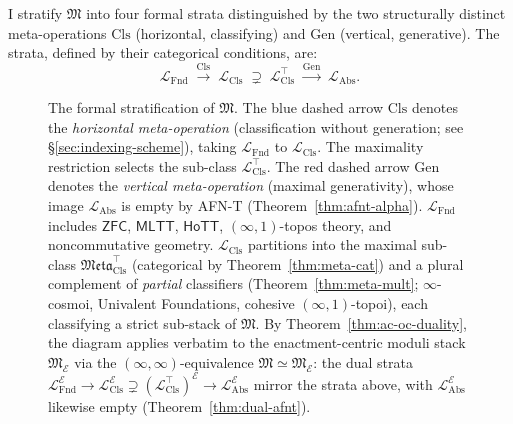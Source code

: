 \documentclass[11pt]{article}
\theoremstyle{plain}
\theoremstyle{definition}
\newcommand{\fM}{\mathfrak{M}}
\newcommand{\Meta}{\mathfrak{Meta}}
\newcommand{\LFnd}{\mathcal{L}_{\mathrm{Fnd}}}
\newcommand{\LCls}{\mathcal{L}_{\mathrm{Cls}}}
\newcommand{\LClsMax}{\mathcal{L}_{\mathrm{Cls}}^{\top}}
\newcommand{\LAbs}{\mathcal{L}_{\mathrm{Abs}}}
\newcommand{\ZFC}{\mathsf{ZFC}}
\newcommand{\MLTT}{\mathsf{MLTT}}
\newcommand{\HoTT}{\mathsf{HoTT}}
\newcommand{\cE}{\mathcal{E}}
\newcommand{\LAbsE}{\LAbs^{\cE}}
\newcommand{\LClsE}{\LCls^{\cE}}
\newcommand{\LClsMaxE}{(\LClsMax)^{\cE}}
\newcommand{\LFndE}{\LFnd^{\cE}}
\begin{document}
I stratify $\fM$ into four formal strata distinguished by the two structurally distinct meta-operations $\mathrm{Cls}$ (horizontal, classifying) and $\mathrm{Gen}$ (vertical, generative). The strata, defined by their categorical conditions, are:
\[
\LFnd \;\xrightarrow{\mathrm{Cls}}\; \LCls \;\supsetneq\; \LClsMax \;\xrightarrow{\mathrm{Gen}}\; \LAbs.
\]

\begin{figure}[ht]
\centering
{}
\caption{The formal stratification of $\fM$. The blue dashed arrow $\mathrm{Cls}$ denotes the \emph{horizontal meta-operation} (classification without generation; see \S\ref{sec:indexing-scheme}), taking $\LFnd$ to $\LCls$. The maximality restriction selects the sub-class $\LClsMax$. The red dashed arrow $\mathrm{Gen}$ denotes the \emph{vertical meta-operation} (maximal generativity), whose image $\LAbs$ is empty by AFN-T (Theorem~\ref{thm:afnt-alpha}). $\LFnd$ includes $\ZFC$, $\MLTT$, $\HoTT$, $(\infty, 1)$-topos theory, and noncommutative geometry. $\LCls$ partitions into the maximal sub-class $\Meta_{\mathrm{Cls}}^{\top}$ (categorical by Theorem~\ref{thm:meta-cat}) and a plural complement of \emph{partial} classifiers (Theorem~\ref{thm:meta-mult}; $\infty$-cosmoi, Univalent Foundations, cohesive $(\infty, 1)$-topoi), each classifying a strict sub-stack of $\fM$. By Theorem~\ref{thm:ac-oc-duality}, the diagram applies verbatim to the enactment-centric moduli stack $\fM_\cE$ via the $(\infty, \infty)$-equivalence $\fM \simeq \fM_\cE$: the dual strata $\LFndE \to \LClsE \supsetneq \LClsMaxE \to \LAbsE$ mirror the strata above, with $\LAbsE$ likewise empty (Theorem~\ref{thm:dual-afnt}).}
\label{fig:hierarchy}
\end{figure}
\end{document}
